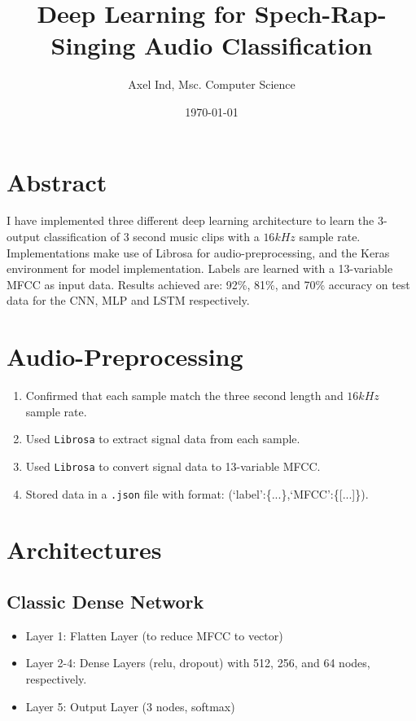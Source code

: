 \documentclass[12pt]{article}
\title{Deep Learning for Spech-Rap-Singing Audio Classification}
\date{\today}
\author{Axel Ind, Msc. Computer Science}
\begin{document}
\maketitle

\section*{Abstract}
I have implemented three different deep learning architecture to learn the 3-output classification of 3 second music clips with a $16kHz$ sample rate. Implementations make use of Librosa for audio-preprocessing, and the Keras environment for model implementation. Labels are learned with a 13-variable MFCC as input data. Results achieved are: 92\%, 81\%, and 70\% accuracy on test data for the CNN, MLP and LSTM respectively.

\section{Audio-Preprocessing}
\begin{enumerate}
\item Confirmed that each sample match the three second length and $16kHz$ sample rate.
\item Used \texttt{Librosa} to extract signal data from each sample.
\item Used \texttt{Librosa} to convert signal data to 13-variable MFCC.
\item Stored data in a \texttt{.json} file with format: (`label':\{...\},`MFCC':\{[...]\}).
\end{enumerate}
\section{Architectures}
\subsection{Classic Dense Network}
\begin{itemize}
\item Layer 1: Flatten Layer (to reduce MFCC to vector)
\item Layer 2-4: Dense Layers (relu, dropout) with 512, 256, and 64 nodes, respectively. 
\item Layer 5: Output Layer (3 nodes, softmax)
\end{itemize}
\end{document}
